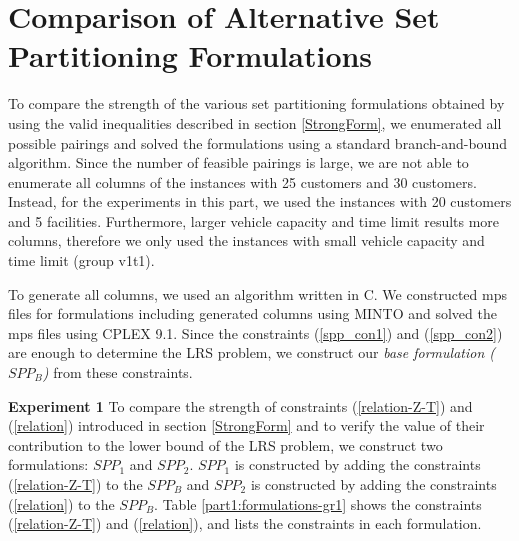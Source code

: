 \section{Comparison of Alternative Set Partitioning Formulations}

To compare the strength of the various set partitioning formulations obtained by
using the valid inequalities described in section \ref{StrongForm}, we 
enumerated all possible pairings and solved the formulations using a standard 
branch-and-bound algorithm. Since the number of feasible pairings is large, 
we are not able to enumerate all columns of the instances with 25 customers and 
30 customers. Instead, for the experiments in this part, we used the instances 
with 20 customers and 5 facilities. Furthermore, larger vehicle capacity and
time limit results more columns, therefore we only used the instances 
with small vehicle capacity and time limit (group v1t1). 
 
To generate all columns, we used an algorithm
written in C. We constructed mps files for formulations including generated 
columns using MINTO and solved the mps files using CPLEX 9.1.  
Since the constraints (\ref{spp_con1}) and 
(\ref{spp_con2}) are enough to determine the LRS problem, we construct our 
{\em base formulation ($SPP_B$)} from these constraints. 

{\bf Experiment 1} To compare the strength of constraints (\ref{relation-Z-T}) and 
(\ref{relation}) introduced in section \ref{StrongForm} and to verify the 
value of their contribution to the lower bound of the LRS problem,
we construct two formulations: $SPP_1$ and $SPP_2$. $SPP_1$ is constructed
by adding the constraints (\ref{relation-Z-T}) to the $SPP_B$ and $SPP_2$ 
is constructed by adding the constraints (\ref{relation}) to the $SPP_B$.
Table \ref{part1:formulations-gr1} shows the constraints (\ref{relation-Z-T}) and
(\ref{relation}), and lists the constraints in each formulation. 

